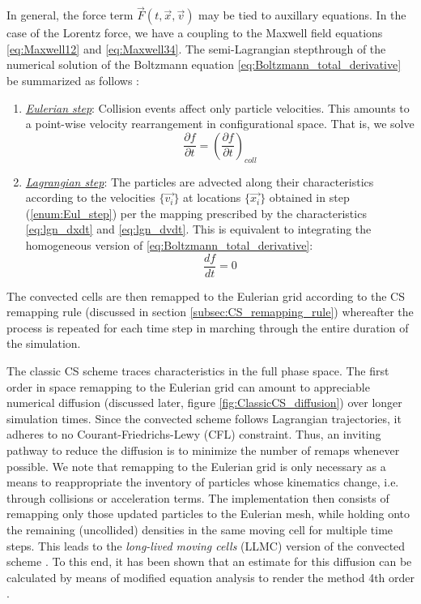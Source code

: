 \documentclass[11pt,titlepage]{report}
\begin{document}
\noindent In general, the force term $\vec{F}(t,\vec{x},\vec{v})$ may be tied to auxillary equations. In the case of the Lorentz force, we have a coupling to the Maxwell field equations \eqref{eq:Maxwell12} and \eqref{eq:Maxwell34}. The semi-Lagrangian stepthrough of the numerical solution of the Boltzmann equation \eqref{eq:Boltzmann_total_derivative} be summarized as follows \cite{Guclu12}:
\begin{enumerate}
\item  \label{enum:Eul_step} \underline{\emph{Eulerian step}}: Collision events affect only particle velocities. This amounts to a point-wise velocity rearrangement in configurational space. That is, we solve
\begin{equation}\frac{\partial f}{\partial t} = \left(\frac{\partial f}{\partial t}\right)_{coll}\end{equation}
\item \label{enum:Lgn_step} \underline{\emph{Lagrangian step}}: The particles are advected along their characteristics according to the velocities $\{\vec{v_i}\}$ at locations $\{\vec{x_i}\}$ obtained in step (\ref{enum:Eul_step}) per the mapping prescribed by the characteristics \eqref{eq:lgn_dxdt} and \eqref{eq:lgn_dvdt}. This is equivalent to integrating the homogeneous version of \eqref{eq:Boltzmann_total_derivative}:
\begin{equation}\frac{df}{dt} = 0 \label{eq:df/dt=0}\end{equation}

\end{enumerate}

\noindent The convected cells are then remapped to the Eulerian grid according to the CS remapping rule (discussed in section \ref{subsec:CS_remapping_rule}) whereafter the process is repeated for each time step in marching through the entire duration of the simulation.

The classic CS scheme \cite{Hitchon89} traces characteristics in the full phase space. The first order in space remapping to the Eulerian grid can amount to appreciable numerical diffusion (discussed later, figure \ref{fig:ClassicCS_diffusion}) over longer simulation times. Since the convected scheme follows Lagrangian trajectories, it adheres to no Courant-Friedrichs-Lewy (CFL) constraint. Thus, an inviting pathway to reduce the diffusion is to minimize the number of remaps whenever possible. We note that remapping to the Eulerian grid is only necessary as a means to reappropriate the inventory of particles whose kinematics change, i.e. through collisions or acceleration terms. The implementation then consists of remapping only those updated particles to the Eulerian mesh, while holding onto the remaining (uncollided) densities in the same moving cell for multiple time steps. This leads to the \emph{long-lived moving cells} (LLMC) version of the convected scheme \cite{Christlieb00, Feng00}. To this end, it has been shown that an estimate for this diffusion can be calculated by means of modified equation analysis to render the method 4th order \cite[p.3294]{Guclu12}. 
\end{document}
